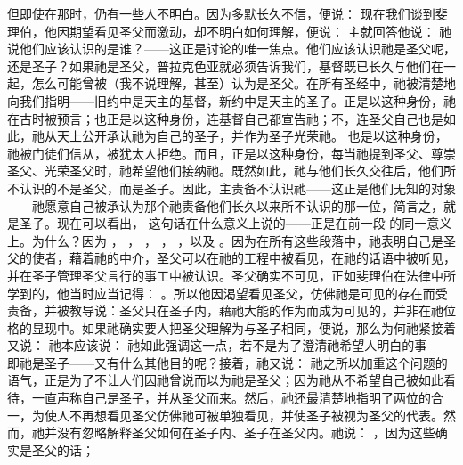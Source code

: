 但即使在那时，仍有一些人不明白。因为多默长久不信，便说：  现在我们谈到斐理伯，他因期望看见圣父而激动，却不明白如何理解，便说： 主就回答他说： 祂说他们应该认识的是谁？——这正是讨论的唯一焦点。他们应该认识祂是圣父呢，还是圣子？如果祂是圣父，普拉克色亚就必须告诉我们，基督既已长久与他们在一起，怎么可能曾被（我不说理解，甚至）认为是圣父。在所有圣经中，祂被清楚地向我们指明——旧约中是天主的基督，新约中是天主的圣子。正是以这种身份，祂在古时被预言；也正是以这种身份，连基督自己都宣告祂；不，连圣父自己也是如此，祂从天上公开承认祂为自己的圣子，并作为圣子光荣祂。  也是以这种身份，祂被门徒们信从，被犹太人拒绝。而且，正是以这种身份，每当祂提到圣父、尊崇圣父、光荣圣父时，祂希望他们接纳祂。既然如此，祂与他们长久交往后，他们所不认识的不是圣父，而是圣子。因此，主责备不认识祂——这正是他们无知的对象——祂愿意自己被承认为那个祂责备他们长久以来所不认识的那一位，简言之，就是圣子。现在可以看出，  这句话在什么意义上说的——正是在前一段  的同一意义上。为什么？因为 ， ， ， ， ，以及 。因为在所有这些段落中，祂表明自己是圣父的使者，藉着祂的中介，圣父可以在祂的工程中被看见，在祂的话语中被听见，并在圣子管理圣父言行的事工中被认识。圣父确实不可见，正如斐理伯在法律中所学到的，他当时应当记得： 。所以他因渴望看见圣父，仿佛祂是可见的存在而受责备，并被教导说：圣父只在圣子内，藉祂大能的作为而成为可见的，并非在祂位格的显现中。如果祂确实要人把圣父理解为与圣子相同，便说，那么为何祂紧接着又说：  祂本应该说： 祂如此强调这一点，若不是为了澄清祂希望人明白的事——即祂是圣子——又有什么其他目的呢？接着，祂又说：  祂之所以加重这个问题的语气，正是为了不让人们因祂曾说而以为祂是圣父；因为祂从不希望自己被如此看待，一直声称自己是圣子，并从圣父而来。然后，祂还最清楚地指明了两位的合一，为使人不再想看见圣父仿佛祂可被单独看见，并使圣子被视为圣父的代表。然而，祂并没有忽略解释圣父如何在圣子内、圣子在圣父内。祂说： ，因为这些确实是圣父的话； 